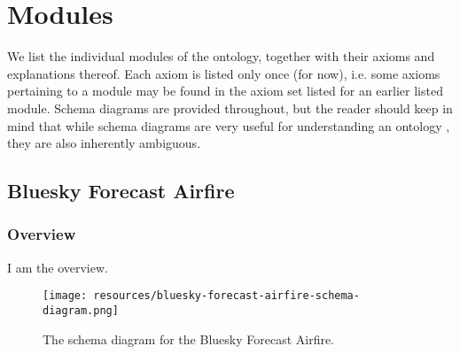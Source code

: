 \chapter{Modules}
\label{sec:mods}
We list the individual modules of the ontology, together with their axioms and explanations thereof. Each axiom is listed only once (for now), i.e. some axioms pertaining to a module may be found in the axiom set listed for an earlier listed module. Schema diagrams are provided throughout, but the reader should keep in mind that while schema diagrams are very useful for understanding an ontology \cite{odp-documentation}, they are also inherently ambiguous.

\section{Bluesky Forecast Airfire}
\label{sec:bluesky-forecast-airfire}
\subsection{Overview}
\label{ssec:overview}

I am the overview.

\begin{figure}[h!]
  \begin{center}
    \texttt{[image: resources/bluesky-forecast-airfire-schema-diagram.png]}
  \end{center}
  \caption{The schema diagram for the Bluesky Forecast Airfire.}
  \label{fig:ov-diagram}
\end{figure}


